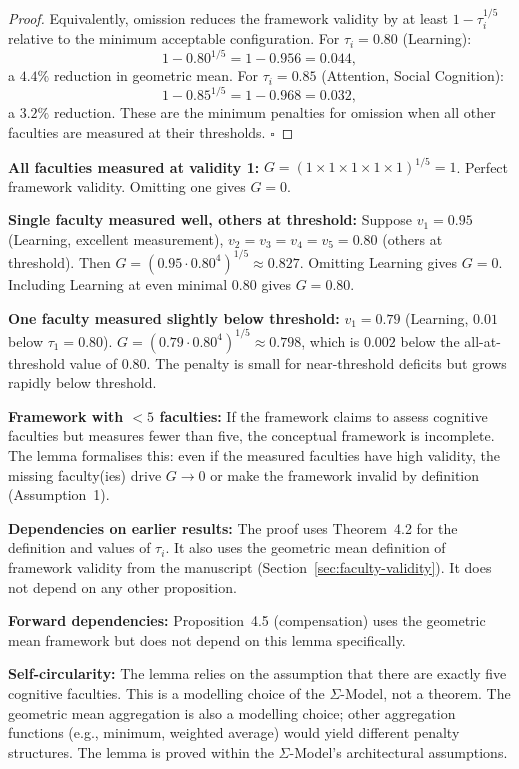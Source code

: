 \begin{proof}
Equivalently, omission reduces the framework validity by at least
$1 - \tau_i^{1/5}$ relative to the minimum acceptable configuration.
For $\tau_i = 0.80$ (Learning):
\[
1 - 0.80^{1/5} = 1 - 0.956 = 0.044,
\]
a $4.4\%$ reduction in geometric mean. For $\tau_i = 0.85$
(Attention, Social Cognition):
\[
1 - 0.85^{1/5} = 1 - 0.968 = 0.032,
\]
a $3.2\%$ reduction. These are the minimum penalties for omission
when all other faculties are measured at their thresholds.
$\square$
\end{proof}

\begin{boundary-case}
\textbf{All faculties measured at validity 1:}
$G = (1 \times 1 \times 1 \times 1 \times 1)^{1/5} = 1$. Perfect
framework validity. Omitting one gives $G = 0$.

\textbf{Single faculty measured well, others at threshold:}
Suppose $v_1 = 0.95$ (Learning, excellent measurement),
$v_2 = v_3 = v_4 = v_5 = 0.80$ (others at threshold).
Then $G = (0.95 \cdot 0.80^4)^{1/5} \approx 0.827$.
Omitting Learning gives $G = 0$. Including Learning at even minimal
$0.80$ gives $G = 0.80$.

\textbf{One faculty measured slightly below threshold:}
$v_1 = 0.79$ (Learning, $0.01$ below $\tau_1 = 0.80$).
$G = (0.79 \cdot 0.80^4)^{1/5} \approx 0.798$, which is $0.002$
below the all-at-threshold value of $0.80$. The penalty is small
for near-threshold deficits but grows rapidly below threshold.

\textbf{Framework with $< 5$ faculties:}
If the framework claims to assess cognitive faculties but measures
fewer than five, the conceptual framework is incomplete. The lemma
formalises this: even if the measured faculties have high validity,
the missing faculty(ies) drive $G \to 0$ or make the framework
invalid by definition (Assumption~1).
\end{boundary-case}

\begin{circularity-check}
\textbf{Dependencies on earlier results:} The proof uses
Theorem~4.2 for the definition and values of $\tau_i$. It also
uses the geometric mean definition of framework validity from
the manuscript (Section~\ref{sec:faculty-validity}). It does not
depend on any other proposition.

\textbf{Forward dependencies:} Proposition~4.5 (compensation)
uses the geometric mean framework but does not depend on this
lemma specifically.

\textbf{Self-circularity:} The lemma relies on the assumption
that there are exactly five cognitive faculties. This is a
modelling choice of the $\Sigma$-Model, not a theorem. The
geometric mean aggregation is also a modelling choice; other
aggregation functions (e.g., minimum, weighted average) would
yield different penalty structures. The lemma is proved within
the $\Sigma$-Model's architectural assumptions.
\end{circularity-check}
